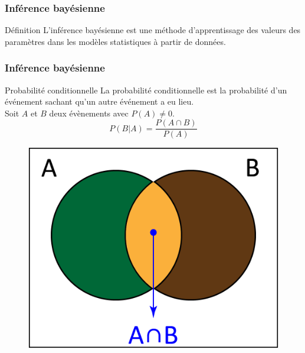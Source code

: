 \documentclass[aspectratio=169,professionalfonts, 12pt]{beamer}
\begin{document}
\begin{frame}
  \frametitle{Inférence bayésienne}
  \justifying 
  \begin{minipage}{\textwidth}
  \begin{block}{Définition}
    L’inférence bayésienne est une méthode d’apprentissage des valeurs des paramètres dans les modèles statistiques à partir de données. 
  \end{block}
  \end{minipage} 
\end{frame}


\begin{frame}
  \frametitle{Inférence bayésienne}
  \begin{minipage}{0.6\textwidth}
  \begin{block}{Probabilité conditionnelle}
    La probabilité conditionnelle est la probabilité d'un événement sachant qu'un autre événement a eu lieu.\\
    Soit \(\displaystyle A \)  et \(\displaystyle B \) deux évènements avec \(\displaystyle P(A) \neq 0 \).
    \begin{equation}
      P(B|A) = \frac{P(A\cap B)}{P(A)}
      \label{conditionnelle_probability}
    \end{equation}
  \end{block}
  \end{minipage}
  \begin{minipage}{2cm}
  
  \end{minipage}
  \begin{minipage}{0.3\textwidth}
    \begin{figure}[t]
    \begin{center}
      \includegraphics[width=\textwidth]{images/etat_art/conditional_b.png}
    \end{center}
    \end{figure} 
  \end{minipage}	
\end{frame}
\end{document}
